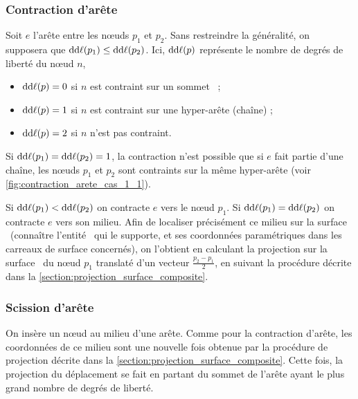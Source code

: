 \subsubsection{Contraction d'arête}
Soit $e$ l'arête entre les n\oe uds $p_1$ et $p_2$. Sans restreindre la généralité, on supposera que $\mathrm{dd}\ell(p_1) \leq 
\mathrm{dd}\ell(p_2)$.
Ici, $\mathrm{dd}\ell(p)$ représente le nombre de degrés de liberté du n\oe ud $n$, \ie 
\begin{itemize}
	\item $\mathrm{dd}\ell(p) = 0$ si $n$ est contraint sur un sommet \brep\ ;
	\item $\mathrm{dd}\ell(p) = 1$ si $n$ est contraint sur une hyper-arête (chaîne) ;
	\item $\mathrm{dd}\ell(p) = 2$ si $n$ n'est pas contraint.
\end{itemize}
Si $\mathrm{dd}\ell(p_1) = \mathrm{dd}\ell(p_2) = 1$, la contraction n'est possible que si $e$ fait partie d'une chaîne, \ie les n\oe uds $p_1$ et $p_2$ sont contraints sur la même hyper-arête (voir \autoref{fig:contraction_arete_cas_1_1}).



Si $\mathrm{dd}\ell(p_1) < \mathrm{dd}\ell(p_2)$ on contracte $e$ vers le n\oe ud $p_1$. 
Si $\mathrm{dd}\ell(p_1) = \mathrm{dd}\ell(p_2)$ on contracte $e$ vers son milieu. Afin de localiser précisément ce milieu sur la surface \brep\ (\ie connaître l'entité \brep\ qui le supporte, et ses coordonnées paramétriques dans les carreaux de surface concernés), on l'obtient en calculant la projection sur la surface \brep\ du n\oe ud $p_1$ translaté d'un vecteur $\frac{p_2 - p_1}{2}$, en suivant la procédure décrite dans la \autoref{section:projection_surface_composite}.


\subsubsection{Scission d'arête}
On insère un n\oe ud au milieu d'une arête. Comme pour la contraction d'arête, les coordonnées de ce milieu sont une nouvelle fois obtenue par la procédure de projection décrite dans la \autoref{section:projection_surface_composite}.
Cette fois, la projection du déplacement se fait en partant du sommet de l'arête ayant le plus grand nombre de degrés de liberté.





